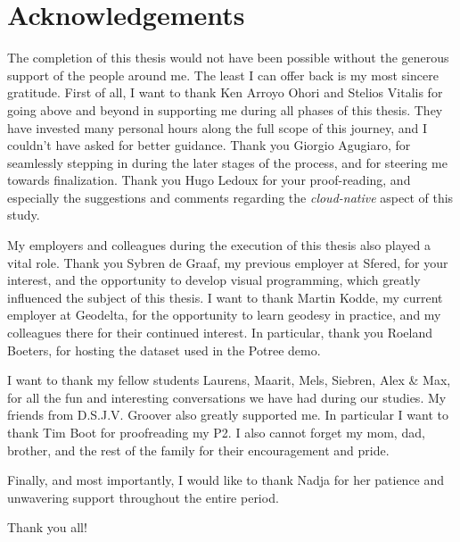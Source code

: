 
\chapter*{Acknowledgements}

The completion of this thesis would not have been possible without the generous support of the people around me. 
The least I can offer back is my most sincere gratitude.
First of all, I want to thank Ken Arroyo Ohori and Stelios Vitalis for going above and beyond in supporting me during all phases of this thesis.
They have invested many personal hours along the full scope of this journey, and I couldn't have asked for better guidance. 
Thank you Giorgio Agugiaro, for seamlessly stepping in during the later stages of the process, and for steering me towards finalization. 
Thank you Hugo Ledoux for your proof-reading, and especially the suggestions and comments regarding the \emph{cloud-native} aspect of this study.

My employers and colleagues during the execution of this thesis also played a vital role. 
Thank you Sybren de Graaf, my previous employer at Sfered, for your interest, and the opportunity to develop visual programming, which greatly influenced the subject of this thesis.
I want to thank Martin Kodde, my current employer at Geodelta, for the opportunity to learn geodesy in practice, and my colleagues there for their continued interest. 
In particular, thank you Roeland Boeters, for hosting the dataset used in the Potree demo.

I want to thank my fellow students Laurens, Maarit, Mels, Siebren, Alex \& Max, for all the fun and interesting conversations we have had during our studies. 
My friends from D.S.J.V. Groover also greatly supported me. In particular I want to thank Tim Boot for proofreading my P2. I also cannot forget my mom, dad, brother, and the rest of the family for their encouragement and pride. 

Finally, and most importantly, I would like to thank Nadja for her patience and unwavering support throughout the entire period.

Thank you all!

